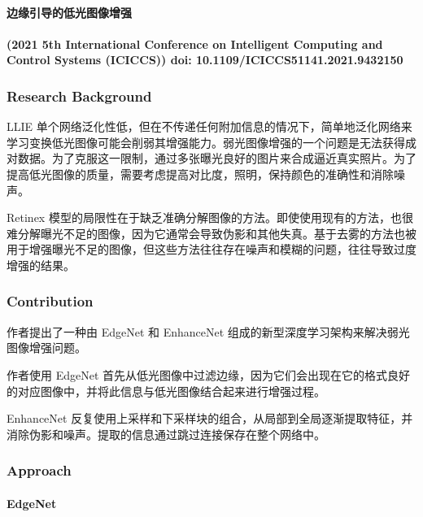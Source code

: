 \documentclass[letterpaper,10pt]{article}
\begin{document}
		\paragraph{边缘引导的低光图像增强 }
			
		\paragraph{(2021 5th International Conference on Intelligent Computing and Control Systems (ICICCS)) doi: 10.1109/ICICCS51141.2021.9432150}
			
			\subsubsection{Research Background}
				
			LLIE 单个网络泛化性低，但在不传递任何附加信息的情况下，简单地泛化网络来学习变换低光图像可能会削弱其增强能力。弱光图像增强的一个问题是无法获得成对数据。为了克服这一限制，通过多张曝光良好的图片来合成逼近真实照片。为了提高低光图像的质量，需要考虑提高对比度，照明，保持颜色的准确性和消除噪声。
			
			Retinex 模型的局限性在于缺乏准确分解图像的方法。即使使用现有的方法，也很难分解曝光不足的图像，因为它通常会导致伪影和其他失真。基于去雾的方法也被用于增强曝光不足的图像，但这些方法往往存在噪声和模糊的问题，往往导致过度增强的结果。
			
			\subsubsection{Contribution}
			
			作者提出了一种由 EdgeNet 和 EnhanceNet 组成的新型深度学习架构来解决弱光图像增强问题。
			
			作者使用 EdgeNet 首先从低光图像中过滤边缘，因为它们会出现在它的格式良好的对应图像中，并将此信息与低光图像结合起来进行增强过程。
			
			EnhanceNet 反复使用上采样和下采样块的组合，从局部到全局逐渐提取特征，并消除伪影和噪声。提取的信息通过跳过连接保存在整个网络中。
				
			\subsubsection{Approach}
			
			\paragraph{EdgeNet}
			
\end{document}
